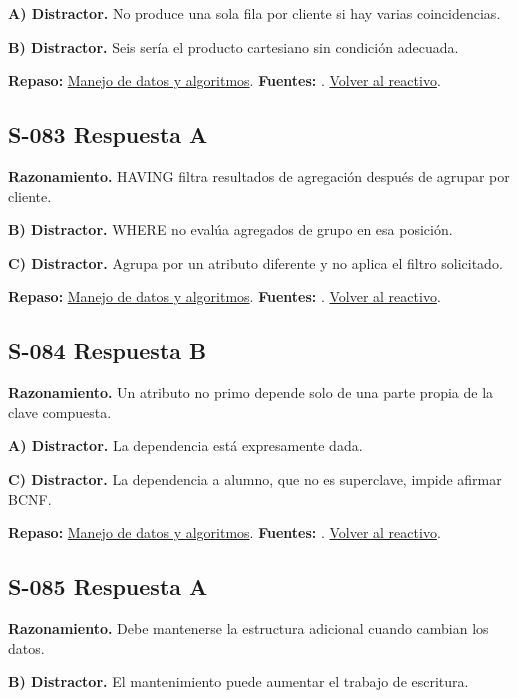 \textbf{A) Distractor. }No produce una sola fila por cliente si hay varias coincidencias.

\textbf{B) Distractor. }Seis sería el producto cartesiano sin condición adecuada.

\textbf{Repaso:} \hyperref[sec:s3]{Manejo de datos y algoritmos}. \textbf{Fuentes:} \cite{postgres}. \hyperref[q:S-082]{Volver al reactivo}.\par\medskip

\subsection*{S-083 \quad Respuesta A}\label{s:S-083}
\textbf{Razonamiento.} HAVING filtra resultados de agregación después de agrupar por cliente.

\textbf{B) Distractor. }WHERE no evalúa agregados de grupo en esa posición.

\textbf{C) Distractor. }Agrupa por un atributo diferente y no aplica el filtro solicitado.

\textbf{Repaso:} \hyperref[sec:s3]{Manejo de datos y algoritmos}. \textbf{Fuentes:} \cite{postgres}. \hyperref[q:S-083]{Volver al reactivo}.\par\medskip

\subsection*{S-084 \quad Respuesta B}\label{s:S-084}
\textbf{Razonamiento.} Un atributo no primo depende solo de una parte propia de la clave compuesta.

\textbf{A) Distractor. }La dependencia está expresamente dada.

\textbf{C) Distractor. }La dependencia a alumno, que no es superclave, impide afirmar BCNF.

\textbf{Repaso:} \hyperref[sec:s3]{Manejo de datos y algoritmos}. \textbf{Fuentes:} \cite{algorithms,postgres,ai}. \hyperref[q:S-084]{Volver al reactivo}.\par\medskip

\subsection*{S-085 \quad Respuesta A}\label{s:S-085}
\textbf{Razonamiento.} Debe mantenerse la estructura adicional cuando cambian los datos.

\textbf{B) Distractor. }El mantenimiento puede aumentar el trabajo de escritura.

